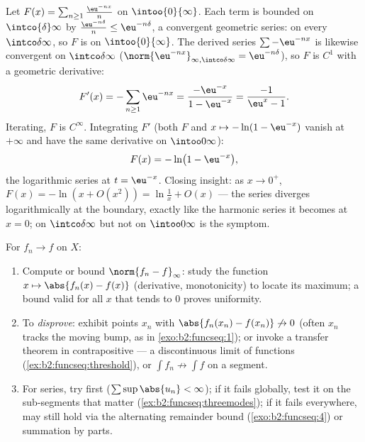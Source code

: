 \begin{example}\label{ex:b2:funcseq:logseries}
Let $F(x) = \sum_{n\geq1} \frac{\eu^{-nx}}{n}$ on
$\intoo{0}{\infty}$. Each term is bounded on $\intco{\delta}
\infty$ by $\frac{\eu^{-n\delta}}{n} \leq \eu^{-n\delta}$, a
convergent geometric series:  on every
$\intco\delta\infty$, so $F$ is  on
$\intoo{0}{\infty}$. The derived series $\sum -\eu^{-nx}$ is
likewise  convergent on $\intco\delta\infty$
($\norm{\eu^{-nx}}_{\infty,\intco\delta\infty} =
\eu^{-n\delta}$), so $F$ is $C^1$ with a geometric derivative:
\[
F'(x) = -\sum_{n\geq1}\eu^{-nx}
= \frac{-\eu^{-x}}{1 - \eu^{-x}}
= \frac{-1}{\eu^{x} - 1} .
\]
Iterating, $F$ is $C^\infty$. Integrating $F'$ (both $F$ and $x
\mapsto -\ln(1 - \eu^{-x})$ vanish at $+\infty$ and have the
same derivative on $\intoo0\infty$):
\[
F(x) = -\ln\bigl(1 - \eu^{-x}\bigr),
\]
the logarithmic series at $t = \eu^{-x}$. Closing insight: as $x
\to 0^+$, $F(x) = -\ln(x + O(x^2)) = \ln\frac1x + O(x)$ --- the
series diverges logarithmically at the boundary, exactly like
the harmonic series it becomes at $x = 0$;  on
$\intco\delta\infty$ but not on $\intoo0\infty$ is the
symptom.
\end{example}

\begin{method}\label{met:b2:funcseq:uniform}
For $f_n \to f$  on $X$:
\begin{enumerate}
  \item Compute or bound $\norm{f_n - f}_\infty$: study the
        function $x \mapsto \abs{f_n(x) - f(x)}$ (derivative,
        monotonicity) to locate its maximum; a bound valid for
        all $x$ that tends to $0$ proves uniformity.
  \item To \emph{disprove}: exhibit points $x_n$ with
        $\abs{f_n(x_n) - f(x_n)} \not\to 0$ (often $x_n$ tracks
        the moving bump, as in \cref{exo:b2:funcseq:1}); or
        invoke a transfer theorem in contrapositive --- a
        discontinuous limit of  functions
        (\cref{ex:b2:funcseq:threshold}), or $\int f_n
        \not\to \int f$ on a segment.
  \item For series, try  first
        ($\sum\sup\abs{u_n} < \infty$); if it fails globally,
        test it on the sub-segments that matter
        (\cref{ex:b2:funcseq:threemodes}); if it fails
        everywhere,  may still hold via the
        alternating remainder bound
        (\cref{exo:b2:funcseq:4}) or summation by parts.
\end{enumerate}
\end{method}

